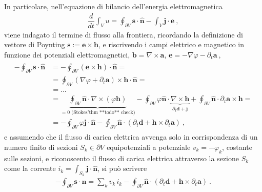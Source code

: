 \documentclass[letterpaper,10pt,english]{jupyterBook}
\begin{document}
\sphinxAtStartPar
In particolare, nell’equazione di bilancio dell’energia elettromagnetica
\begin{equation*}
\begin{split}\dfrac{d}{dt} \int_V u = \oint_{\partial V} \mathbf{s} \cdot \hat{\mathbf{n}} - \int_V \mathbf{j} \cdot \mathbf{e} \ ,\end{split}
\end{equation*}
\sphinxAtStartPar
viene indagato il termine di flusso alla frontiera, ricordando la definizione di vettore di Poynting \(\mathbf{s} := \mathbf{e} \times \mathbf{h}\), e riscrivendo i campi elettrico e magnetico in funzione dei potenziali elettromagnetici, \(\mathbf{b} = \nabla \times \mathbf{a}\), \(\mathbf{e} = - \nabla \varphi - \partial_t \mathbf{a} \ ,\)
\begin{equation*}
\begin{split}\begin{aligned}
  - \oint_{\partial V} \mathbf{s} \cdot \mathbf{\hat{n}}
  & = - \oint_{\partial V} \left(\mathbf{e} \times \mathbf{h} \right) \cdot \mathbf{\hat{n}} = \\
  & =   \oint_{\partial V} \left(\nabla \varphi + \partial_t \mathbf{a} \right) \times \mathbf{h}  \cdot \mathbf{\hat{n}} = \\
  & = ... \\
  & = \underbrace{\oint_{\partial V} \hat{\mathbf{n}} \cdot \nabla \times ( \varphi \mathbf{h} )}_{=0 \text{ (Stokes'thm **todo** check)}} - \oint_{\partial V} \varphi \hat{\mathbf{n}} \cdot \underbrace{\nabla \times \mathbf{h}}_{\partial_t \mathbf{d} + \mathbf{j}} + \oint_{\partial V} \hat{\mathbf{n}} \cdot \partial_t \mathbf{a} \times \mathbf{h} = \\
  & = - \oint_{\partial V} \varphi \mathbf{j} \cdot \hat{\mathbf{n}} - \oint_{\partial V} \hat{\mathbf{n}} \cdot \left( \partial_t \mathbf{d} + \mathbf{h} \times \partial_t \mathbf{a} \right) \ , 
\end{aligned}\end{split}
\end{equation*}
\sphinxAtStartPar
e assumendo che il flusso di carica elettrica avvenga solo in corrispondenza di un numero finito di sezioni \(S_k \in \partial V\) equipotenziali a potenziale \(v_k = -\varphi_k\), costante sulle sezioni, e riconoscento il flusso di carica elettrica attraverso la sezione \(S_k\) come la corrente \(i_k = \int_{S_k} \mathbf{j} \cdot \hat{\mathbf{n}}\), si può scrivere
\begin{equation*}
\begin{split}- \oint_{\partial V} \mathbf{s} \cdot \hat{\mathbf{n}} = \sum_k v_k \, i_k - \oint_{\partial V} \hat{\mathbf{n}} \cdot \left( \partial_t \mathbf{d} + \mathbf{h} \times \partial_t \mathbf{a} \right) \ .\end{split}
\end{equation*}
\end{document}
